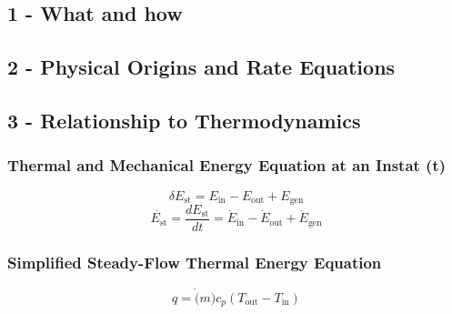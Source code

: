 \documentclass[10pt,landscape]{article}
\begin{document}
\begin{multicols}{3}
\subsection{1 - What and how}
\subsection{2 - Physical Origins and Rate Equations}
\subsection{3 - Relationship to Thermodynamics}
\subsubsection{Thermal and Mechanical Energy Equation at an Instat (t)}
\begin{equation}
    \delta E_{\text{st}}=E_\text{in}-E_\text{out}+E_\text{gen}
\end{equation}
\begin{equation}
    \dot{E_{\text{st}}}=\frac{dE_\text{st}}{dt}=\dot{E}_\text{in}-\dot{E}_\text{out}+\dot{E}_\text{gen}
\end{equation}
\subsubsection{Simplified Steady-Flow Thermal Energy Equation}
\begin{equation}
    q=\dot(m)c_p(T_\text{out}-T_\text{in})
\end{equation}

\end{multicols}
\end{document}
